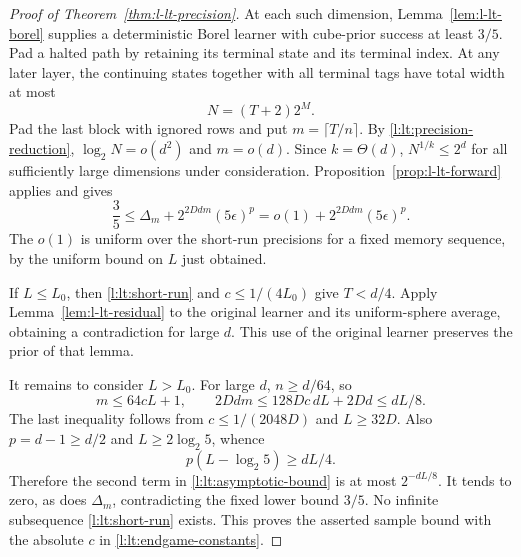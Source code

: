 \begin{proof}[Proof of Theorem~\ref{thm:l-lt-precision}]
At each such dimension, Lemma~\ref{lem:l-lt-borel} supplies a
deterministic Borel learner with cube-prior success at least $3/5$.
Pad a halted path by retaining its terminal state and its terminal
index.  At any later layer, the continuing states together with all
terminal tags have total width at most
\begin{equation}\label{l:lt:global-width}
 N=(T+2)2^M.
\end{equation}
Pad the last block with ignored rows and put $m=\lceil T/n\rceil$.
By \eqref{l:lt:precision-reduction},
$\log_2 N=o(d^2)$ and $m=o(d)$.  Since $k=\Theta(d)$,
$N^{1/k}\le2^d$ for all sufficiently large dimensions under
consideration.  Proposition~\ref{prop:l-lt-forward} applies and gives
\begin{equation}\label{l:lt:asymptotic-bound}
 \frac35\le \Delta_m+2^{2Ddm}(5\epsilon)^p
            =o(1)+2^{2Ddm}(5\epsilon)^p.
\end{equation}
The $o(1)$ is uniform over the short-run precisions for a fixed memory
sequence, by the uniform bound on $L$ just obtained.

If $L\le L_0$, then \eqref{l:lt:short-run} and
$c\le1/(4L_0)$ give $T<d/4$.  Apply
Lemma~\ref{lem:l-lt-residual} to the original learner and its
uniform-sphere average, obtaining a contradiction for large $d$.
This use of the original learner preserves the prior of that lemma.

It remains to consider $L>L_0$.  For large $d$, $n\ge d/64$, so
\[
 m\le64cL+1,\qquad
 2Ddm\le128Dc\,dL+2Dd\le dL/8.
\]
The last inequality follows from $c\le1/(2048D)$ and
$L\ge32D$.  Also $p=d-1\ge d/2$ and $L\ge2\log_2 5$, whence
\[
 p(L-\log_2 5)\ge dL/4.
\]
Therefore the second term in \eqref{l:lt:asymptotic-bound} is at most
$2^{-dL/8}$.  It tends to zero, as does $\Delta_m$, contradicting
the fixed lower bound $3/5$.  No infinite subsequence
\eqref{l:lt:short-run} exists.  This proves the asserted sample
bound with the absolute $c$ in \eqref{l:lt:endgame-constants}.
\end{proof}
